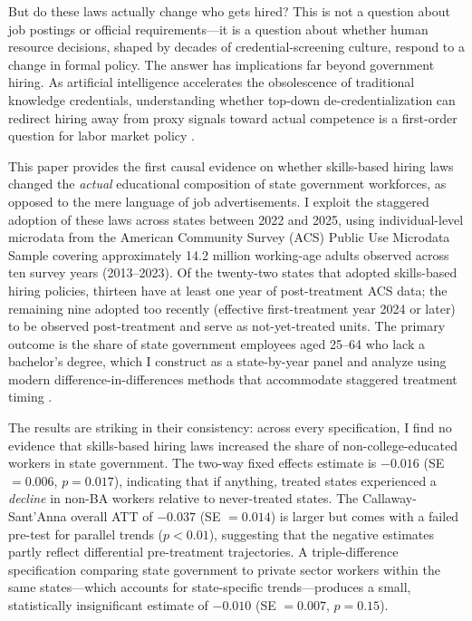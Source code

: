 \documentclass[12pt]{article}
\begin{document}
But do these laws actually change who gets hired? This is not a question about job postings or official requirements---it is a question about whether human resource decisions, shaped by decades of credential-screening culture, respond to a change in formal policy. The answer has implications far beyond government hiring. As artificial intelligence accelerates the obsolescence of traditional knowledge credentials, understanding whether top-down de-credentialization can redirect hiring away from proxy signals toward actual competence is a first-order question for labor market policy \citep{Deming2017,AutorLevy2003}.

This paper provides the first causal evidence on whether skills-based hiring laws changed the \emph{actual} educational composition of state government workforces, as opposed to the mere language of job advertisements. I exploit the staggered adoption of these laws across states between 2022 and 2025, using individual-level microdata from the American Community Survey (ACS) Public Use Microdata Sample covering approximately 14.2 million working-age adults observed across ten survey years (2013--2023). Of the twenty-two states that adopted skills-based hiring policies, thirteen have at least one year of post-treatment ACS data; the remaining nine adopted too recently (effective first-treatment year 2024 or later) to be observed post-treatment and serve as not-yet-treated units. The primary outcome is the share of state government employees aged 25--64 who lack a bachelor's degree, which I construct as a state-by-year panel and analyze using modern difference-in-differences methods that accommodate staggered treatment timing \citep{CallawaySantanna2021, SunAbraham2021}.

The results are striking in their consistency: across every specification, I find no evidence that skills-based hiring laws increased the share of non-college-educated workers in state government. The two-way fixed effects estimate is $-0.016$ (SE $= 0.006$, $p = 0.017$), indicating that if anything, treated states experienced a \emph{decline} in non-BA workers relative to never-treated states. The Callaway-Sant'Anna overall ATT of $-0.037$ (SE $= 0.014$) is larger but comes with a failed pre-test for parallel trends ($p < 0.01$), suggesting that the negative estimates partly reflect differential pre-treatment trajectories. A triple-difference specification comparing state government to private sector workers within the same states---which accounts for state-specific trends---produces a small, statistically insignificant estimate of $-0.010$ (SE $= 0.007$, $p = 0.15$).
\end{document}
